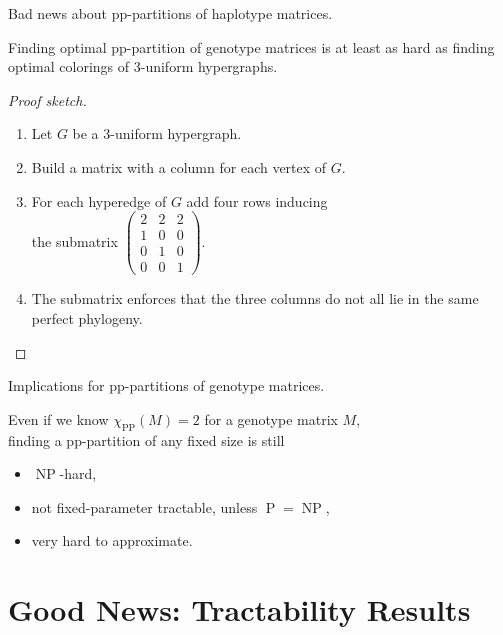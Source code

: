 \documentclass{beamer}
\begin{document}
\begin{frame}{Bad news about pp-partitions of haplotype matrices.}
  \begin{theorem}
    Finding \alert{optimal pp-partition of genotype matrices}
    is at least as hard as finding \alert{optimal colorings of
      3-uniform hypergraphs}. 
  \end{theorem}

  \begin{proof}[Proof sketch]
    \begin{enumerate}
    \item Let $G$ be a 3-uniform hypergraph.
    \item Build a matrix with a column for each vertex of $G$.
    \item For each hyperedge of $G$ add four rows inducing\\ the submatrix
      $\left(
        \begin{smallmatrix}
          2 & 2 & 2 \\
          1 & 0 & 0 \\
          0 & 1 & 0 \\
          0 & 0 & 1
        \end{smallmatrix}\right)
      $.
    \item The submatrix enforces that the three columns do not all lie
      in the same perfect phylogeny. \qedhere
    \end{enumerate}
  \end{proof}
\end{frame}

\begin{frame}{Implications for pp-partitions of genotype matrices.}
  \begin{corollary}
    Even if we know $\chi_{\operatorname{PP}}(M) = 2$ for a genotype matrix $M$,\\
    finding a pp-partition of any fixed size is still
    \begin{itemize}
    \item $\operatorname{NP}$-hard,
    \item not fixed-parameter tractable, unless
      $\operatorname{P}=\operatorname{NP}$, 
    \item very hard to approximate.
    \end{itemize}
  \end{corollary}
\end{frame}


\section{Good News: Tractability Results}
\end{document}
